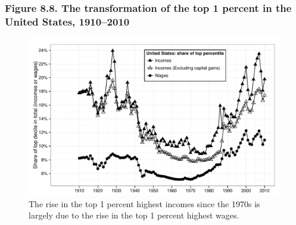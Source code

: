 \documentclass[t]{beamer}\usepackage[]{graphicx}\usepackage[]{color}
\newenvironment{knitrout}{}{} %
\begin{document}
\begin{frame}[label=Figure_8_8,fragile]
\frametitle{Figure 8.8. The transformation of the top 1 percent in the United States, 1910--2010}
\begin{figure}[t]
\begin{minipage}[b]{\textwidth}
\centering 
\begin{knitrout}\footnotesize
{}\color{fgcolor}

{\centering \includegraphics[width=1\linewidth]{figures/bw/Figure_8_8} 

}



\end{knitrout}
\caption{The rise in the top 1 percent highest incomes since the 1970s is largely due to the rise in the top 1 percent highest wages.}
\end{minipage}
\end{figure}
\end{frame}
\end{document}
